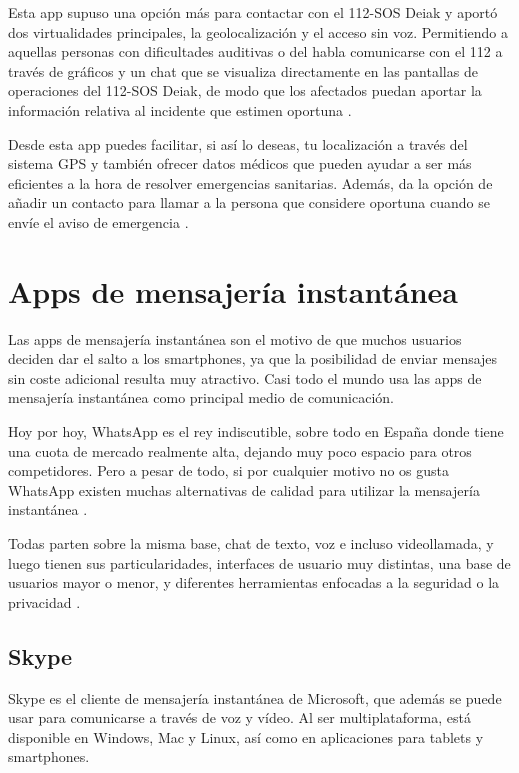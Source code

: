 Esta app supuso una opción más para contactar con el 112-SOS Deiak y aportó dos virtualidades principales, la geolocalización y el acceso sin voz. Permitiendo a aquellas personas con dificultades auditivas o del habla comunicarse con el 112 a través de gráficos y un chat que se visualiza directamente en las pantallas de operaciones del 112-SOS Deiak, de modo que los afectados puedan aportar la información relativa al incidente que estimen oportuna \cite{deiak3}.

Desde esta app puedes facilitar, si así lo deseas, tu localización a través del sistema GPS y también ofrecer datos médicos que pueden ayudar a ser más eficientes a la hora de resolver emergencias sanitarias. Además, da la opción de añadir un contacto para llamar a la persona que considere oportuna cuando se envíe el aviso de emergencia \cite{deiak3}.

\section{Apps de mensajería instantánea}

Las apps de mensajería instantánea son el motivo de que muchos usuarios deciden dar el salto a los smartphones, ya que la posibilidad de enviar mensajes sin coste adicional resulta muy atractivo. Casi todo el mundo usa las apps de mensajería instantánea como principal medio de comunicación.

Hoy por hoy, WhatsApp es el rey indiscutible, sobre todo en España donde tiene una cuota de mercado realmente alta, dejando muy poco espacio para otros competidores. Pero a pesar de todo, si por cualquier motivo no os gusta WhatsApp existen muchas alternativas de calidad para utilizar la mensajería instantánea \cite{im6}.

Todas parten sobre la misma base, chat de texto, voz e incluso videollamada, y luego tienen sus particularidades, interfaces de usuario muy distintas, una base de usuarios mayor o menor, y diferentes herramientas enfocadas a la seguridad o la privacidad \cite{im4}.

\subsection{Skype}

Skype es el cliente de mensajería instantánea de Microsoft, que además se puede usar para comunicarse a través de voz y vídeo. Al ser multiplataforma, está disponible en Windows, Mac y Linux, así como en aplicaciones para tablets y smartphones.

